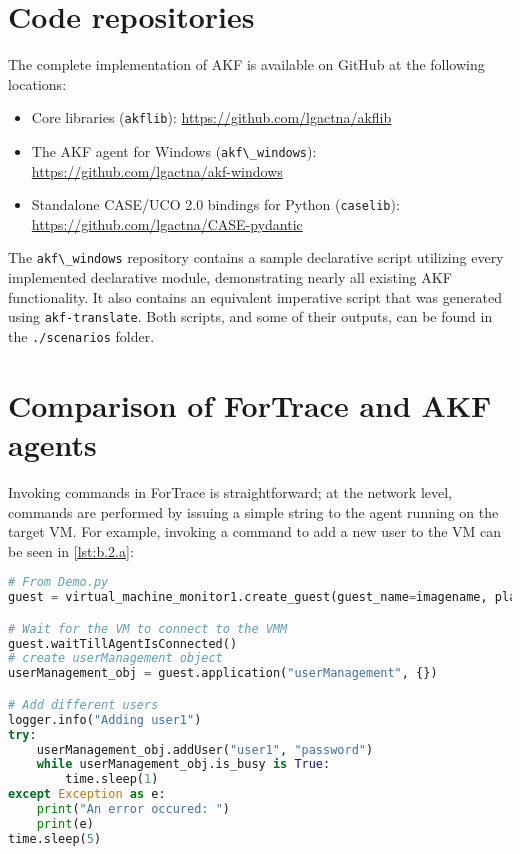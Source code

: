 \section{Code repositories}\label{code-repositories}

The complete implementation of AKF is available on GitHub at the
following locations:

\begin{itemize}
\tightlist
\item
  Core libraries (\passthrough{\lstinline!akflib!}):
  \url{https://github.com/lgactna/akflib}
\item
  The AKF agent for Windows (\passthrough{\lstinline!akf\_windows!}):
  \url{https://github.com/lgactna/akf-windows}
\item
  Standalone CASE/UCO 2.0 bindings for Python
  (\passthrough{\lstinline!caselib!}):
  \url{https://github.com/lgactna/CASE-pydantic}
\end{itemize}

The \passthrough{\lstinline!akf\_windows!} repository contains a sample
declarative script utilizing every implemented declarative module,
demonstrating nearly all existing AKF functionality. It also contains an
equivalent imperative script that was generated using
\passthrough{\lstinline!akf-translate!}. Both scripts, and some of their
outputs, can be found in the \passthrough{\lstinline!./scenarios!}
folder.

\section{Comparison of ForTrace and AKF
agents}\label{comparison-of-fortrace-and-akf-agents}

Invoking commands in ForTrace
\cite{gobelForTraceHolisticForensic2022} is straightforward; at the
network level, commands are performed by issuing a simple string to the
agent running on the target VM. For example, invoking a command to add a
new user to the VM can be seen in \autoref{lst:b.2.a}:

\begin{lstlisting}[label={lst:b.2.a}, caption={Creating a new user through ForTrace agent commands}, language=Python]
# From Demo.py
guest = virtual_machine_monitor1.create_guest(guest_name=imagename, platform="windows")

# Wait for the VM to connect to the VMM
guest.waitTillAgentIsConnected()
# create userManagement object
userManagement_obj = guest.application("userManagement", {})

# Add different users
logger.info("Adding user1")
try:
    userManagement_obj.addUser("user1", "password")
    while userManagement_obj.is_busy is True:
        time.sleep(1)
except Exception as e:
    print("An error occured: ")
    print(e)
time.sleep(5)
\end{lstlisting}

